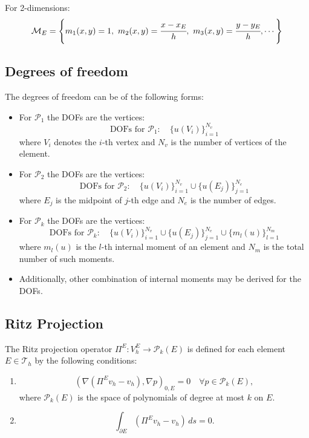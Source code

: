 \documentclass[class=article, crop=false]{standalone}
\begin{document}
For 2-dimensions:
\begin{equation}
    \mathcal{M}_E = \left\{m_1(x,y) = 1,\ m_2(x,y) = \cfrac{x-x_E}{h},\ m_3(x,y) = \cfrac{y-y_E}{h}, \cdots\right\}
\end{equation}



\subsection{Degrees of freedom}
The degrees of freedom can be of the following forms:
\begin{itemize}
    \item For $\mathcal{P}_1$ the DOFs are the vertices:
    $$\text{DOFs for } \mathcal{P}_1: \quad \{ u(V_i) \}_{i=1}^{N_v}$$
    where $V_i$ denotes the $i$-th vertex and $N_v$ is the number of vertices of the element.
    
    \item For $\mathcal{P}_2$ the DOFs are the vertices:
    $$\text{DOFs for } \mathcal{P}_2: \quad \{ u(V_i) \}_{i=1}^{N_v} \cup \{ u(E_j) \}_{j=1}^{N_e}$$
    where $E_j$ is the midpoint of $j$-th edge and $N_e$ is the number of edges.
    
    \item For $\mathcal{P}_k$ the DOFs are the vertices:
    $$\text{DOFs for } \mathcal{P}_k: \quad \{ u(V_i) \}_{i=1}^{N_v} \cup \{ u(E_j) \}_{j=1}^{N_e} \cup \{ m_l(u) \}_{l=1}^{N_m}$$
    where $m_l(u)$ is the $l$-th internal moment of an element and $N_m$ is the total number of such moments.

    \item Additionally, other combination of internal moments may be derived for the DOFs.    
\end{itemize}



\subsection{Ritz Projection}
The Ritz projection operator $\Pi^E: V_h^E \rightarrow \mathcal{P}_k(E)$ is defined for each element $E \in \mathcal{T}_h$ by the following conditions:
\begin{enumerate}
    \item
    \[
    (\nabla (\Pi^E v_h - v_h), \nabla p)_{0,E} = 0 \quad \forall p \in \mathcal{P}_k(E),
    \]
    where $\mathcal{P}_k(E)$ is the space of polynomials of degree at most $k$ on $E$.
    
    \item
    \[
    \int_{\partial E} (\Pi^E v_h - v_h) \, ds = 0.
    \]
\end{enumerate}
\end{document}
